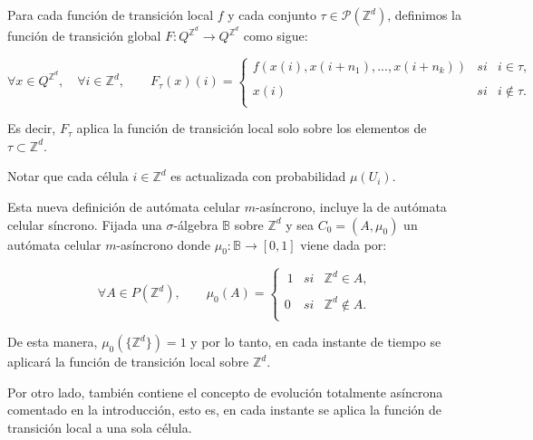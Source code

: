 \documentclass[../proyecto.tex]{memoir}
\begin{document}
\begin{defi}

Para cada función de transición local $f$ y cada conjunto $\tau \in \mathcal{P}(\mathds{Z}^{d})$, definimos la función de transición global $F:Q^{\mathds{Z}^{d}} \to Q^{\mathds{Z}^{d}}$ como sigue:

\begin{equation*}
	\forall x \in Q^{\mathds{Z}^{d}}, \quad \forall i \in \mathds{Z}^{d}, \qquad
	F_{\tau}(x)(i) = \left\{ \begin{array}{lcc}
             f(x(i),x(i+n_{1}),...,x(i+n_{k})) &   si  & i \in \tau ,\\
             \\ x(i) & si  & i \notin \tau .\\
             \end{array}
             \right.
\end{equation*}

Es decir, $F_{\tau}$ aplica la función de transición local solo sobre los elementos de $\tau \subset \mathds{Z}^{d}$. 
\end{defi}

Notar que cada célula $i \in \mathds{Z}^{d}$ es actualizada con probabilidad $\mu(U_{i})$.

Esta nueva definición de autómata celular $m$-asíncrono, incluye la de autómata celular síncrono. Fijada una $\sigma$-álgebra $\mathds{B}$ sobre $\mathds{Z}^{d}$ y sea $C_{0}=(A, \mu_{0})$ un autómata celular $m$-asíncrono donde $\mu_{0}: \mathds{B} \rightarrow [0,1]$ viene dada por: 

\begin{equation*}
	 \forall A \in P(\mathds{Z}^{d}), \qquad 
	 \mu_{0}(A) = \left\{ \begin{array}{lcc}
             \ 1 &   si  & \mathds{Z}^{d} \in A ,\\
             \\0 &   si  & \mathds{Z}^{d} \notin A .\\
             \end{array}
             \right.
\end{equation*}

De esta manera, $\mu_{0}(\{\mathds{Z}^{d}\})=1$ y por lo tanto, en cada instante de tiempo se aplicará la función de transición local sobre $\mathds{Z}^{d}$.

Por otro lado, también contiene el concepto de evolución totalmente asíncrona comentado en la introducción, esto es, en cada instante se aplica la función de transición local a una sola célula. 
\end{document}
